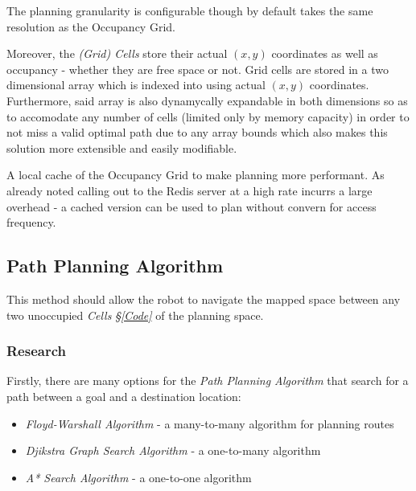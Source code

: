 \documentclass[11pt, a4paper]{article}
\begin{document}
The planning granularity is configurable though by default takes the same resolution as the Occupancy Grid.

Moreover, the \textit{(Grid) Cells} store their actual $(x ,y)$ coordinates as well as occupancy - whether 
they are free space or not. Grid cells are stored in a two dimensional array which is indexed into using 
actual $(x ,y)$ coordinates. Furthermore, said array is also dynamycally expandable in both dimensions so
as to accomodate any number of cells (limited only by memory capacity) in order to not miss a valid 
optimal path due to any array bounds which also makes this solution more extensible and easily modifiable.

A local cache of the Occupancy Grid to make planning more performant. As already noted calling out to 
the Redis server at a high rate incurrs a large overhead - a cached version can be used to plan
without convern for access frequency.




\subsection{Path Planning Algorithm}
\label{Path_Planning_Algorithm}

This method should allow the robot to navigate the mapped space between any two unoccupied \textit{Cells} \textit{\S\ref{Code}} of the planning space.

\subsubsection{Research}

Firstly, there are many options for the \textit{Path Planning Algorithm} that search for a path between a goal and a destination location:

\begin{itemize}

	\item \textit{Floyd-Warshall Algorithm} \cite{path_warshall} - a many-to-many algorithm for planning routes
	\item \textit{Djikstra Graph Search Algorithm} \cite{path_djikstra} - a one-to-many algorithm
	\item \textit{A* Search Algorithm} \cite{path_astar}	- a one-to-one algorithm

\end{itemize}
\end{document}
